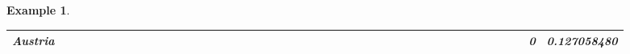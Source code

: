 \documentclass[a4paper,11pt]{report}
\newtheorem{example}[theorem]{Example}
\begin{document}
\begin{example}
\begin{appendices}
\begin{landscape}
\begin{longtable}{r|r|r|r|r|r|r|r|r|r|r|r|r|r|r|r|r|r|r|r|r|r|r|r|r|r|r|r|r|r|r|r|r|r|r|r|r|r|r|r|r|r|r|r|}
\multicolumn{1}{|r|}{\textbf{Austria}}         &                                       &                                       &                                       &                                          &                                       &                                       &                                        &                                       &                                      &                                       &                                       &                                                &                                       &                                      &                                       &                                       &                                      &                                       &                                       &                                       &                                      &                                     &                                      &                                         &                                     &                                       &                                          &                                      &                                       &                                      &                                          &                                      &                                        &                                     &                                      &                                           &                                               &                                       &                                              &                                      &                                     & 0                                             & 0.127058480                             \\ \hline

\end{longtable}
\end{landscape}
\end{appendices}
\end{example}
\end{document}
